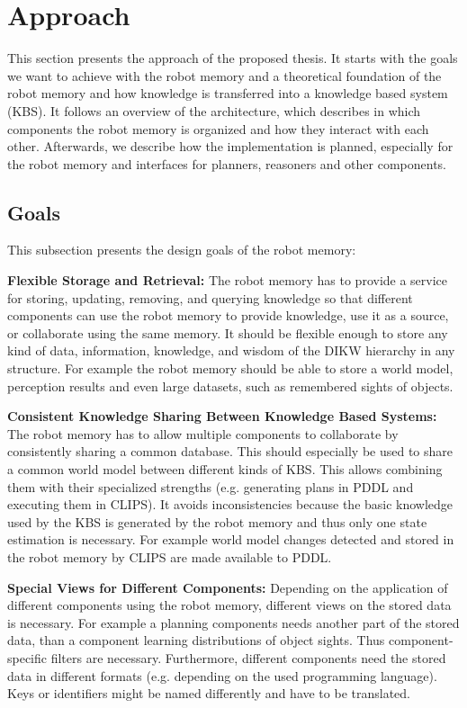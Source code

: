 \chapter{Approach}
\label{sec:approach}
This section presents the approach of the proposed thesis. It starts
with the goals we want to achieve with the robot memory and a
theoretical foundation of the robot memory and how knowledge is
transferred into a knowledge based system (KBS). It follows an overview of the
architecture, which describes in which components the robot memory is
organized and how they interact with each other. Afterwards, we
describe how the implementation is planned, especially for the robot
memory and interfaces for planners, reasoners and other components.

\section{Goals}
\label{sec:goals}

This subsection presents the design goals of the robot memory:

\smallskip
\textbf{Flexible Storage and Retrieval:} The robot memory has to
provide a service for storing, updating, removing, and querying knowledge
so that different components can use the robot memory to provide knowledge,
use it as a source, or collaborate using the same memory. It should be
flexible enough to store any kind of data, information, knowledge, and
wisdom of the DIKW hierarchy in any structure. For example the robot
memory should be able to store a world model, perception results and
even large datasets, such as remembered sights of objects.

\smallskip
\textbf{Consistent Knowledge Sharing Between Knowledge Based Systems:}
The robot memory has to allow multiple components to collaborate by
consistently sharing a common database. This should especially be used
to share a common world model between different kinds of KBS. This
allows combining them with their specialized strengths
(e.g. generating plans in PDDL and executing them in CLIPS).  It
avoids inconsistencies because the basic knowledge used by the KBS is
generated by the robot memory and thus only one state estimation is
necessary. For example world model changes detected and stored in the
robot memory by CLIPS are made available to PDDL.

\smallskip
\textbf{Special Views for Different Components:} Depending on the
application of different components using the robot memory, different
views on the stored data is necessary. For example a planning
components needs another part of the stored data, than a component
learning distributions of object sights. Thus component-specific
filters are necessary. Furthermore, different components need the
stored data in different formats (e.g. depending on the used
programming language). Keys or identifiers might be named differently
and have to be translated.

